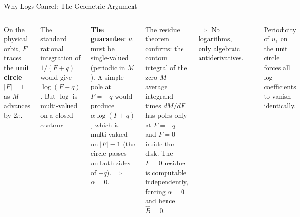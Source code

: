 \documentclass[aspectratio=169, 11pt]{beamer}
\begin{document}
\begin{frame}{Why Logs Cancel: The Geometric Argument}

\begin{columns}[T]
On the physical orbit, $F$ traces the \textbf{unit circle}
$|F| = 1$ as $M$ advances by $2\pi$.

\vspace{0.3em}
The standard rational integration of $1/(F+q)$ would give $\log(F+q)$.
But $\log$ is multi-valued on a closed contour.

\vspace{0.3em}
\textbf{The guarantee}: $u_1$ must be single-valued (periodic in $M$).
A simple pole at $F = -q$ would produce $\alpha\log(F+q)$, which is
multi-valued on $|F|=1$ (the circle passes on both sides of $-q$).
$\Rightarrow$ $\alpha = 0$.

\vspace{0.3em}
The residue theorem confirms: the contour integral of the
zero-$M$-average integrand times $dM/dF$ has poles only at $F=-q$
and $F=0$ inside the disk. The $F=0$ residue is computable
independently, forcing $\alpha = 0$ and hence $\hat B = 0$.

\vspace{0.3em}
$\Rightarrow$ No logarithms, only \alert{algebraic} antiderivatives.

\vspace{-0.5em}
\begin{center}
\end{center}

\vspace{0.1em}
{\small Periodicity of $u_1$ on the unit circle forces all log
coefficients to vanish identically.}
\end{columns}

\end{frame}
\end{document}

